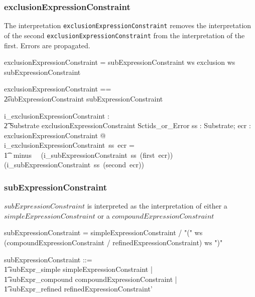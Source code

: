 \documentclass{article}
\def\spec#1{{\tt #1}}
\def\bnf#1{{\scriptsize {{#1}} }}
\begin{document}
\subsubsection{exclusionExpressionConstraint}
The interpretation \spec{exclusionExpressionConstraint} removes the interpretation of the second \spec{exclusionExpressionConstraint} from
the interpretation of the first.  Errors are propagated.

\begin{framed}
\noindent
\bnf{exclusionExpressionConstraint = subExpressionConstraint ws exclusion ws subExpressionConstraint}
\end{framed}

\begin{zed}
exclusionExpressionConstraint == \\ 
\t2subExpressionConstraint \cross subExpressionConstraint
\end{zed}

\begin{gendef}
    i\_exclusionExpressionConstraint : \\
\t2 Substrate \fun exclusionExpressionConstraint \fun Sctids\_or\_Error
\where
   \forall ss : Substrate; ecr : exclusionExpressionConstraint @ \\
i\_exclusionExpressionConstraint~ss~ecr = \\
\t1~ minus~~ (i\_subExpressionConstraint~ss~(first~ecr)) (i\_subExpressionConstraint~ss~(second~ecr))
\end{gendef}

\subsubsection{subExpressionConstraint}
$subExpressionConstraint$ is interpreted as the interpretation of either a $simpleExpressionConstraint$
or a $compoundExpressionConstraint$
\begin{framed}
\noindent
\bnf{subExpressionConstraint = simpleExpressionConstraint / "(" ws (compoundExpressionConstraint / refinedExpressionConstraint)  ws ")"}
\end{framed}

\begin{zed}
subExpressionConstraint ::= \\
\t1 subExpr\_simple \ldata simpleExpressionConstraint \rdata | \\
\t1 subExpr\_compound \ldata compoundExpressionConstraint \rdata | \\
\t1 subExpr\_refined \ldata refinedExpressionConstraint' \rdata
\end{zed}
\end{document}
